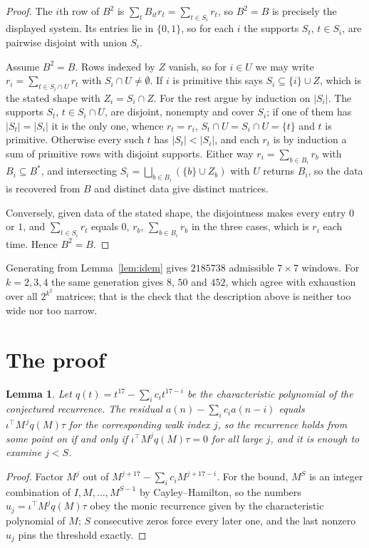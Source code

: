 \documentclass[11pt,a4paper]{article}
\theoremstyle{plain}
\newtheorem{lemma}[theorem]{Lemma}
\theoremstyle{definition}
\begin{document}
\begin{proof}
The $i$th row of $B^2$ is $\sum_t B_{it}r_t=\sum_{t\in S_i}r_t$, so $B^2=B$ is precisely the
displayed system. Its entries lie in $\{0,1\}$, so for each $i$ the supports $S_t$,
$t\in S_i$, are pairwise disjoint with union $S_i$.

Assume $B^2=B$. Rows indexed by $Z$ vanish, so for $i\in U$ we may write
$r_i=\sum_{t\in S_i\cap U}r_t$ with $S_i\cap U\neq\emptyset$. If $i$ is primitive this says
$S_i\subseteq\{i\}\cup Z$, which is the stated shape with $Z_i=S_i\cap Z$. For the rest argue
by induction on $|S_i|$. The supports $S_t$, $t\in S_i\cap U$, are disjoint, nonempty and
cover $S_i$; if one of them has $|S_t|=|S_i|$ it is the only one, whence $r_t=r_i$,
$S_t\cap U=S_i\cap U=\{t\}$ and $t$ is primitive. Otherwise every such $t$ has
$|S_t|<|S_i|$, and each $r_t$ is by induction a sum of primitive rows with disjoint supports.
Either way $r_i=\sum_{b\in B_i}r_b$ with $B_i\subseteq B^{\ast}$, and intersecting
$S_i=\bigsqcup_{b\in B_i}(\{b\}\cup Z_b)$ with $U$ returns $B_i$, so the data is recovered
from $B$ and distinct data give distinct matrices.

Conversely, given data of the stated shape, the disjointness makes every entry $0$ or $1$, and
$\sum_{t\in S_i}r_t$ equals $0$, $r_b$, $\sum_{b\in B_i}r_b$ in the three cases, which is
$r_i$ each time. Hence $B^2=B$.
\end{proof}

Generating from Lemma~\ref{lem:idem} gives $2185738$ admissible $7\times7$ windows. For
$k=2,3,4$ the same generation gives $8$, $50$ and $452$, which agree with exhaustion over all
$2^{k^2}$ matrices; that is the check that the description above is neither too wide nor too
narrow.

\section{The proof}

\begin{lemma}\label{lem:crit}
Let $q(t)=t^{17}-\sum_i c_it^{17-i}$ be the characteristic polynomial of the
conjectured recurrence. The residual $a(n)-\sum_ic_ia(n-i)$ equals
$\iota^{\!\top}M^{\,j}q(M)\tau$ for the corresponding walk index $j$, so the recurrence
holds from some point on if and only if $\iota^{\!\top}M^{j}q(M)\tau=0$ for all large $j$,
and it is enough to examine $j<S$.
\end{lemma}

\begin{proof}
Factor $M^{j}$ out of $M^{j+17}-\sum_ic_iM^{j+17-i}$. For the bound, $M^{S}$
is an integer combination of $I,M,\dots,M^{S-1}$ by Cayley--Hamilton, so the numbers
$u_j=\iota^{\!\top}M^{j}q(M)\tau$ obey the monic recurrence given by the characteristic
polynomial of $M$; $S$ consecutive zeros force every later one, and the last nonzero $u_j$
pins the threshold exactly.
\end{proof}
\end{document}
